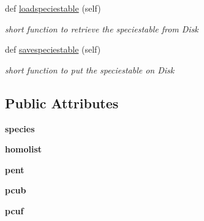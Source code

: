 \begin{DoxyCompactItemize}
def \mbox{\hyperlink{class_py_c_u_b_1_1py_c_u_b_1_1_py_c_u_b_ac37364050a4ec9a7ddf3d6c1562e49a5}{loadspeciestable}} (self)
\begin{DoxyCompactList}\small\item\em short function to retrieve the speciestable from Disk \end{DoxyCompactList}\item 
def \mbox{\hyperlink{class_py_c_u_b_1_1py_c_u_b_1_1_py_c_u_b_a8249834e1d2f7d061ae06ffa5a1adc32}{savespeciestable}} (self)
\begin{DoxyCompactList}\small\item\em short function to put the speciestable on Disk \end{DoxyCompactList}\end{DoxyCompactItemize}
\subsection*{Public Attributes}
\begin{DoxyCompactItemize}
\item 
\mbox{\label{class_py_c_u_b_1_1py_c_u_b_1_1_py_c_u_b_a60cc232d3d52f88fe8a80244b3fcddc8}} 
{\bfseries species}
\item 
\mbox{\label{class_py_c_u_b_1_1py_c_u_b_1_1_py_c_u_b_a91b69c31f346c4983b40c1525739cf16}} 
{\bfseries homolist}
\item 
\mbox{\label{class_py_c_u_b_1_1py_c_u_b_1_1_py_c_u_b_ab2fcbabe6d3870dbbaa0cfd11605b004}} 
{\bfseries pent}
\item 
\mbox{\label{class_py_c_u_b_1_1py_c_u_b_1_1_py_c_u_b_a9f1b34d59aff65055117cde8a174a474}} 
{\bfseries pcub}
\item 
\mbox{\label{class_py_c_u_b_1_1py_c_u_b_1_1_py_c_u_b_a0081f01dedc28de7864a2424c6760546}} 
{\bfseries pcuf}
\end{DoxyCompactItemize}
